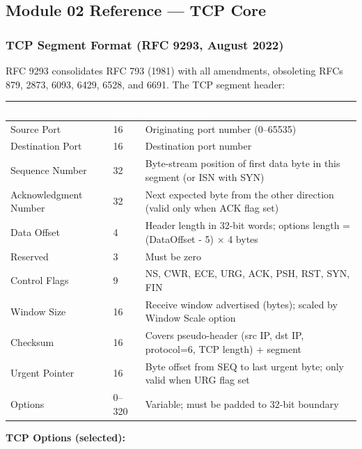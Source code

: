 \documentclass[11pt,letterpaper]{article}
\newcommand{\tableheader}[1]{\textbf{\sffamily\textcolor{white}{#1}}}
\begin{document}
\subsection{Module 02 Reference --- TCP Core}

\subsubsection{TCP Segment Format (RFC 9293, August 2022)}

RFC 9293 consolidates RFC 793 (1981) with all amendments, obsoleting RFCs 879, 2873, 6093, 6429, 6528, and 6691. The TCP segment header:

\begin{center}
\begin{tabularx}{\textwidth}{L{3.2cm}C{1.4cm}X}
\toprule
{}
\tableheader{Field} & \tableheader{Bits} & \tableheader{Description} \\
\midrule
Source Port & 16 & Originating port number (0--65535) \\
Destination Port & 16 & Destination port number \\
Sequence Number & 32 & Byte-stream position of first data byte in this segment (or ISN with SYN) \\
Acknowledgment Number & 32 & Next expected byte from the other direction (valid only when ACK flag set) \\
Data Offset & 4 & Header length in 32-bit words; options length = (DataOffset - 5) × 4 bytes \\
Reserved & 3 & Must be zero \\
Control Flags & 9 & NS, CWR, ECE, URG, ACK, PSH, RST, SYN, FIN \\
Window Size & 16 & Receive window advertised (bytes); scaled by Window Scale option \\
Checksum & 16 & Covers pseudo-header (src IP, dst IP, protocol=6, TCP length) + segment \\
Urgent Pointer & 16 & Byte offset from SEQ to last urgent byte; only valid when URG flag set \\
Options & 0--320 & Variable; must be padded to 32-bit boundary \\
\bottomrule
\end{tabularx}
\end{center}

\textbf{TCP Options (selected):}
\end{document}
